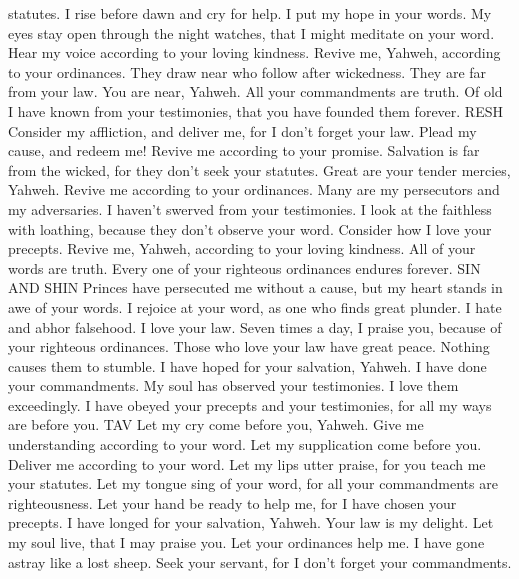 statutes.  I rise before dawn and cry for help. I put my
hope in your words.  My eyes stay open through the night
watches, that I might meditate on your word.  Hear my
voice according to your loving kindness. Revive me, Yahweh, according to
your ordinances.  They draw near who follow after
wickedness. They are far from your law.  You are near,
Yahweh. All your commandments are truth.  Of old I have
known from your testimonies, that you have founded them forever. RESH
 Consider my affliction, and deliver me, for I don't
forget your law.  Plead my cause, and redeem me! Revive
me according to your promise.  Salvation is far from the
wicked, for they don't seek your statutes.  Great are
your tender mercies, Yahweh. Revive me according to your ordinances.
 Many are my persecutors and my adversaries. I haven't
swerved from your testimonies.  I look at the faithless
with loathing, because they don't observe your word. 
Consider how I love your precepts. Revive me, Yahweh, according to your
loving kindness.  All of your words are truth. Every one
of your righteous ordinances endures forever. SIN AND SHIN
 Princes have persecuted me without a cause, but my
heart stands in awe of your words.  I rejoice at your
word, as one who finds great plunder.  I hate and abhor
falsehood. I love your law.  Seven times a day, I praise
you, because of your righteous ordinances.  Those who
love your law have great peace. Nothing causes them to stumble.
 I have hoped for your salvation, Yahweh. I have done
your commandments.  My soul has observed your
testimonies. I love them exceedingly.  I have obeyed
your precepts and your testimonies, for all my ways are before you. TAV
 Let my cry come before you, Yahweh. Give me
understanding according to your word.  Let my
supplication come before you. Deliver me according to your word.
 Let my lips utter praise, for you teach me your
statutes.  Let my tongue sing of your word, for all your
commandments are righteousness.  Let your hand be ready
to help me, for I have chosen your precepts.  I have
longed for your salvation, Yahweh. Your law is my delight.
 Let my soul live, that I may praise you. Let your
ordinances help me.  I have gone astray like a lost
sheep. Seek your servant, for I don't forget your commandments.

